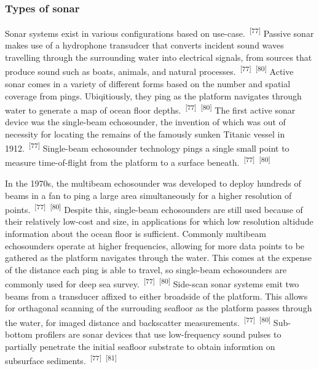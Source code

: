 \documentclass{article}
\begin{document}
\subsubsection{Types of sonar}

\par{Sonar systems exist in various configurations based on use-case.~\textsuperscript{[77]} Passive sonar makes use of a hydrophone transudcer that converts incident sound waves travelling through the surrounding water into electrical signals, from sources that produce sound such as boats, animals, and natural processes.~\textsuperscript{[77]}~\textsuperscript{[80]} Active sonar comes in a variety of different forms based on the number and spatial coverage from pings. Ubiqitiously, they ping as the platform navigates through water to generate a map of ocean floor depths.~\textsuperscript{[77]}~\textsuperscript{[80]} The first active sonar device was the single-beam echosounder, the invention of which was out of necessity for locating the remains of the famously sunken Titanic vessel in 1912.~\textsuperscript{[77]} Single-beam echosounder technology pings a single small point to measure time-of-flight from the platform to a surface beneath.~\textsuperscript{[77]}~\textsuperscript{[80]}}

\par{In the 1970s, the multibeam echosounder was developed to deploy hundreds of beams in a fan to ping a large area simultaneously for a higher resolution of points.~\textsuperscript{[77]}~\textsuperscript{[80]}  Despite this, single-beam echosounders are still used because of their relatively low-cost and size, in applications for which low resolution altidude information about the ocean floor is sufficient. Commonly multibeam echosounders operate at higher frequencies, allowing for more data points to be gathered as the platform navigates through the water. This comes at the expense of the distance each ping is able to travel, so single-beam echosounders are commonly used for deep sea survey.~\textsuperscript{[77]}~\textsuperscript{[80]} Side-scan sonar systems emit two beams from a transducer affixed to either broadside of the platform. This allows for orthagonal scanning of the surrouding seafloor as the platform passes through the water, for imaged distance and backscatter measurements.~\textsuperscript{[77]}~\textsuperscript{[80]} Sub-bottom profilers are sonar devices that use low-frequency sound pulses to partially penetrate the initial seafloor substrate to obtain informtion on subsurface sediments.~\textsuperscript{[77]}~\textsuperscript{[81]}}
\end{document}
